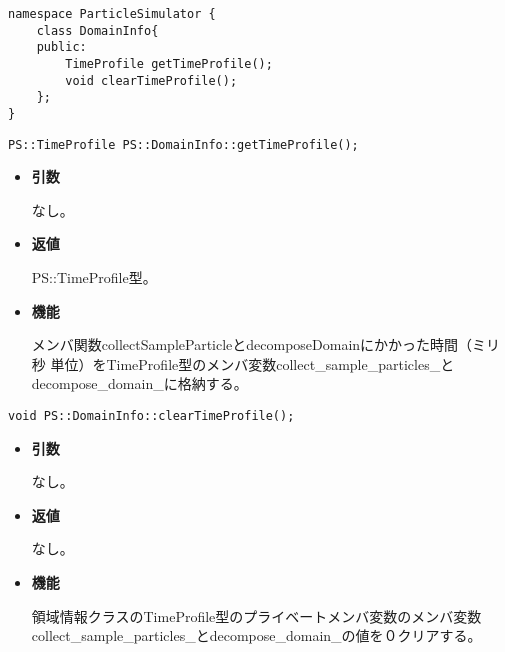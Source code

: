 \begin{lstlisting}[caption=DomainInfo3]
namespace ParticleSimulator {
    class DomainInfo{
    public:
        TimeProfile getTimeProfile();
        void clearTimeProfile();
    };
}
\end{lstlisting}

\begin{screen}
\begin{verbatim}
PS::TimeProfile PS::DomainInfo::getTimeProfile();
\end{verbatim}
\end{screen}

\begin{itemize}

\item {\bf 引数}

なし。

\item {\bf 返値}

PS::TimeProfile型。

\item {\bf 機能}

メンバ関数collectSampleParticleとdecomposeDomainにかかった時間（ミリ秒
単位）をTimeProfile型のメンバ変数collect\_sample\_particles\_と
decompose\_domain\_に格納する。

\end{itemize}

\begin{screen}
\begin{verbatim}
void PS::DomainInfo::clearTimeProfile();
\end{verbatim}
\end{screen}

\begin{itemize}

\item {\bf 引数}

なし。

\item {\bf 返値}

なし。

\item {\bf 機能}

領域情報クラスのTimeProfile型のプライベートメンバ変数のメンバ変数
collect\_sample\_particles\_とdecompose\_domain\_の値を０クリアする。

\end{itemize}

